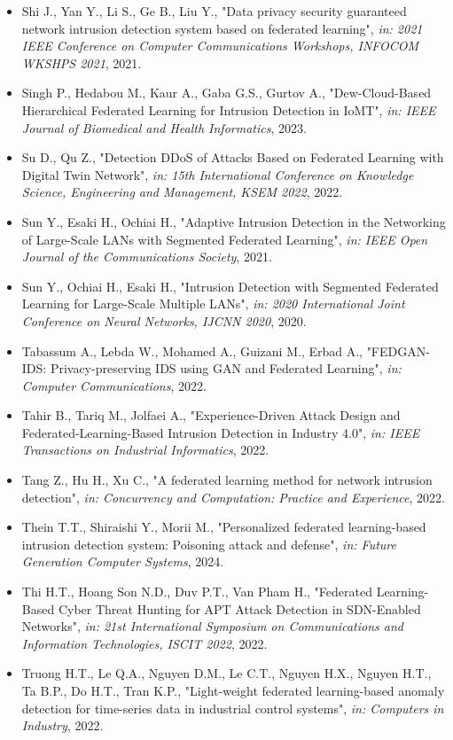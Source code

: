 \begin{itemize}
  \item Shi J., Yan Y., Li S., Ge B., Liu Y., "Data privacy security guaranteed network intrusion detection system based on federated learning", \textit{in: 2021 IEEE Conference on Computer Communications Workshops, INFOCOM WKSHPS 2021}, 2021.
  \item Singh P., Hedabou M., Kaur A., Gaba G.S., Gurtov A., "Dew-Cloud-Based Hierarchical Federated Learning for Intrusion Detection in IoMT", \textit{in: IEEE Journal of Biomedical and Health Informatics}, 2023.
  \item Su D., Qu Z., "Detection DDoS of Attacks Based on Federated Learning with Digital Twin Network", \textit{in: 15th International Conference on Knowledge Science, Engineering and Management, KSEM 2022}, 2022.
  \item Sun Y., Esaki H., Ochiai H., "Adaptive Intrusion Detection in the Networking of Large-Scale LANs with Segmented Federated Learning", \textit{in: IEEE Open Journal of the Communications Society}, 2021.
  \item Sun Y., Ochiai H., Esaki H., "Intrusion Detection with Segmented Federated Learning for Large-Scale Multiple LANs", \textit{in: 2020 International Joint Conference on Neural Networks, IJCNN 2020}, 2020.
  \item Tabassum A., Lebda W., Mohamed A., Guizani M., Erbad A., "FEDGAN-IDS: Privacy-preserving IDS using GAN and Federated Learning", \textit{in: Computer Communications}, 2022.
  \item Tahir B., Tariq M., Jolfaei A., "Experience-Driven Attack Design and Federated-Learning-Based Intrusion Detection in Industry 4.0", \textit{in: IEEE Transactions on Industrial Informatics}, 2022.
  \item Tang Z., Hu H., Xu C., "A federated learning method for network intrusion detection", \textit{in: Concurrency and Computation: Practice and Experience}, 2022.
  \item Thein T.T., Shiraishi Y., Morii M., "Personalized federated learning-based intrusion detection system: Poisoning attack and defense", \textit{in: Future Generation Computer Systems}, 2024.
  \item Thi H.T., Hoang Son N.D., Duv P.T., Van Pham H., "Federated Learning-Based Cyber Threat Hunting for APT Attack Detection in SDN-Enabled Networks", \textit{in: 21st International Symposium on Communications and Information Technologies, ISCIT 2022}, 2022.
  \item Truong H.T., Le Q.A., Nguyen D.M., Le C.T., Nguyen H.X., Nguyen H.T., Ta B.P., Do H.T., Tran K.P., "Light-weight federated learning-based anomaly detection for time-series data in industrial control systems", \textit{in: Computers in Industry}, 2022.

\end{itemize}
